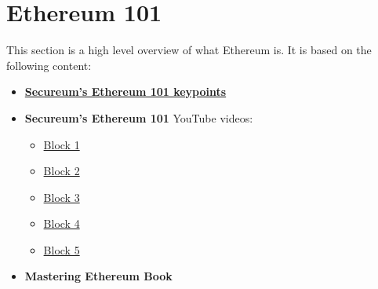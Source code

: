 \chapter{Ethereum 101}\label{ethereum-101}

This section is a high level overview of what Ethereum is. It is based
on the following content:

\begin{itemize}
\tightlist
\item
  \href{https://secureum.substack.com/p/ethereum-101}{\textbf{Secureum's
  Ethereum 101 keypoints}}
\item
  \textbf{Secureum's Ethereum 101} YouTube videos:

  \begin{itemize}
  \tightlist
  \item
    \href{https://www.youtube.com/watch?v=44qhIBMGMoM}{Block 1}
  \item
    \href{https://www.youtube.com/watch?v=zIeBfuXxuWs}{Block 2}
  \item
    \href{https://www.youtube.com/watch?v=ltvTIr4K63s}{Block 3}
  \item
    \href{https://www.youtube.com/watch?v=MFoxW07ICKs}{Block 4}
  \item
    \href{https://www.youtube.com/watch?v=I-TjCtjDs1M}{Block 5}
  \end{itemize}
\item
  \textbf{Mastering Ethereum Book}
\end{itemize}
